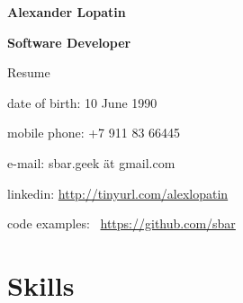 \begin{center}
\fontsize{16pt}{12pt}\selectfont
\bfseries Alexander Lopatin\mdseries

\fontsize{12pt}{12pt}\selectfont
\bfseries Software Developer\mdseries

Resume
\end{center}
{
\fontsize{10pt}{8pt}\selectfont
\begin{center}
\item date of birth: 10 June 1990
\item mobile phone: +7 911 83 66445
\item e-mail: sbar.geek ät gmail.com
\item linkedin: \href{http://tinyurl.com/alexlopatin}{http://tinyurl.com/alexlopatin}
\item code examples: \
\href{https://github.com/sbar?tab=repositories}{https://github.com/sbar}
\end{center}
}


\fontsize{11pt}{12pt}\selectfont

\section{Skills}

